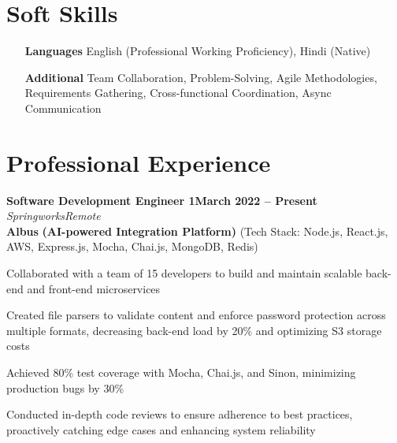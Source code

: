 \documentclass[letterpaper, 10pt]{article}
\newcommand{\heading}[2]{ \hspace{6pt}#1\hfill#2\\[0.8pt] }
\newcommand{\headingBf}[2]{ \heading{\textbf{#1}}{\textbf{#2}} }
\newcommand{\headingIt}[2]{ \heading{\textit{#1}}{\textit{#2}} }
\newenvironment{resume_list}{
\vspace{-5pt}
\begin{itemize}[itemsep=-3pt, parsep=0.2pt, leftmargin=20pt] }{ \end{itemize}
\vspace{-4pt}
}
\begin{document}
	\section{Soft Skills}
	\begin{itemize}[itemsep=-2pt, parsep=0.5pt, leftmargin=70pt]
		\item[\textbf{Languages}] English (Professional Working Proficiency), Hindi
			(Native)

		\item[\textbf{Additional}] Team Collaboration, Problem-Solving, Agile Methodologies,
			Requirements Gathering, Cross-functional Coordination, Async Communication
	\end{itemize}

	\section{Professional Experience}
	\headingBf{Software Development Engineer 1}{March 2022 -- Present}
	\vspace{1pt}
	\headingIt{Springworks}{Remote}
	\vspace{2pt}
	\hspace{10pt}\textbf{Albus} \textbf{(AI-powered Integration Platform)} \small{(Tech Stack: Node.js, React.js, AWS, Express.js, Mocha, Chai.js, MongoDB, Redis)}
	\vspace{1pt}
	\begin{resume_list}
		\item Collaborated with a team of 15 developers to build and maintain scalable
		back-end and front-end microservices \item Created file parsers to validate
		content and enforce password protection across multiple formats, decreasing
		back-end load by 20\% and optimizing S3 storage costs \item Achieved 80\%
		test coverage with Mocha, Chai.js, and Sinon, minimizing production bugs by 30\%
		\item Conducted in-depth code reviews to ensure adherence to best practices,
		proactively catching edge cases and enhancing system reliability
	\end{resume_list}

	\vspace{2pt}
\end{document}
